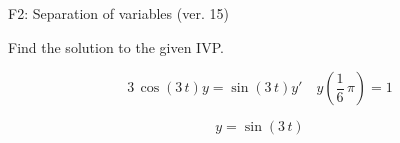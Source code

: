 \begin{exercise}
  \begin{exerciseTitle}F2: Separation of variables (ver. 15)\end{exerciseTitle}
  \begin{exerciseStatement}
    
Find the solution to the given IVP.

    
\[3 \, \cos\left(3 \, t\right) y= \sin\left(3 \, t\right) y'\hspace{1em} y\left( \frac{1}{6} \, \pi \right)= 1\]

  \end{exerciseStatement}
  \begin{exerciseAnswer}
    
\[y= \sin\left(3 \, t\right)\]

  \end{exerciseAnswer}
\end{exercise}